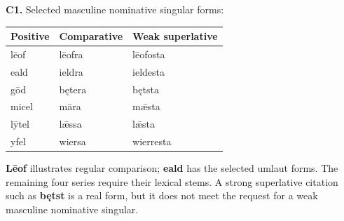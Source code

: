 \par\begin{minipage}{\linewidth}\raggedright
\textbf{C1.} Selected masculine nominative singular forms:

\par\begingroup
\fontsize{10.5}{13.2}\selectfont
\setlength{\LTleft}{0pt}\setlength{\LTright}{\fill}
\noindent
\begin{tabular}{@{}>{\raggedright\arraybackslash}p{34.56mm}>{\raggedright\arraybackslash}p{38.02mm}>{\raggedright\arraybackslash}p{45.8mm}@{}}
\toprule
\textbf{Positive} & \textbf{Comparative} & \textbf{Weak superlative} \\
\midrule
lēof & lēofra & lēofosta \\
eald & ieldra & ieldesta \\
gōd & bętera & bętsta \\
micel & māra & mǣsta \\
lȳtel & lǣssa & lǣsta \\
yfel & wiersa & wierresta \\
\bottomrule
\end{tabular}
\par\endgroup

\textbf{Lēof} illustrates regular comparison; \textbf{eald} has the selected umlaut forms. The remaining four series require their lexical stems. A strong superlative citation such as \textbf{bętst} is a real form, but it does not meet the request for a weak masculine nominative singular.

\end{minipage}\par\addvspace{4pt}


